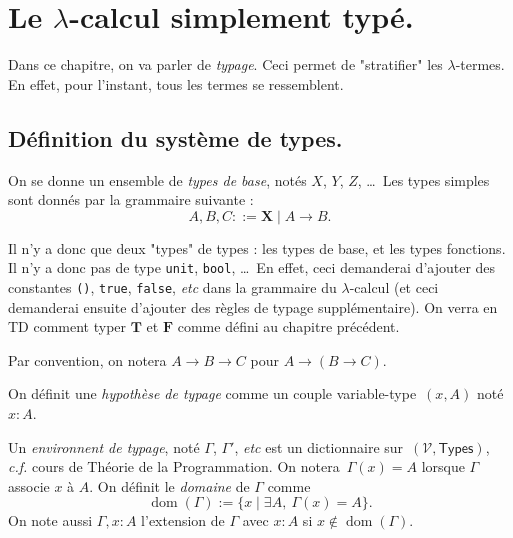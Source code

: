 \documentclass[./main]{subfiles}
\begin{document}
  \chapter{Le $\lambda$-calcul simplement typé.}

  Dans ce chapitre, on va parler de \textit{typage}. Ceci permet de "stratifier" les $\lambda$-termes.
  En effet, pour l'instant, tous les termes se ressemblent.

  \section{Définition du système de types.}

  \begin{defn}
    On se donne un ensemble de \textit{types de base}, notés $X$, $Y$, $Z$, \ldots\
    Les types simples sont donnés par la grammaire suivante :
    \[
      A, B, C ::= \boldsymbol{X}  \mid A \to B
    .\]
  \end{defn}

  Il n'y a donc que deux "types" de types : les types de base, et les types fonctions.
  Il n'y a donc pas de type \lstinline|unit|, \lstinline|bool|, \ldots\ En effet, ceci demanderai d'ajouter des constantes \lstinline|()|, \lstinline|true|, \lstinline|false|, \textit{etc} dans la grammaire du $\lambda$-calcul (et ceci demanderai ensuite d'ajouter des règles de typage supplémentaire). On verra en TD comment typer  $\mathbf{T}$ et $\mathbf{F}$ comme défini au chapitre précédent.

  Par convention, on notera $A \to B \to C$ pour $A \to (B \to C)$.

  \begin{defn}
    On définit une \textit{hypothèse de typage} comme un couple variable-type~$(x, A)$ noté $x: A$.
  \end{defn}

  \begin{defn}
    Un \textit{environnent de typage}, noté $\Gamma$, $\Gamma'$,  \textit{etc} est un dictionnaire sur~$(\mathcal{V}, \mathsf{Types})$, \textit{c.f.} cours de Théorie de la Programmation.
    On notera~$\Gamma(x) = A$ lorsque  $\Gamma$ associe  $x$ à $A$. On définit le \textit{domaine} de $\Gamma$ comme \[
      \operatorname{dom}(\Gamma) := \{x  \mid \exists A, \: \Gamma(x) = A\}
    .\]
    On note aussi $\Gamma, x : A$ l'extension de  $\Gamma$ avec $x : A$ si $x\not\in \operatorname{dom}(\Gamma)$.
  \end{defn}
\end{document}
